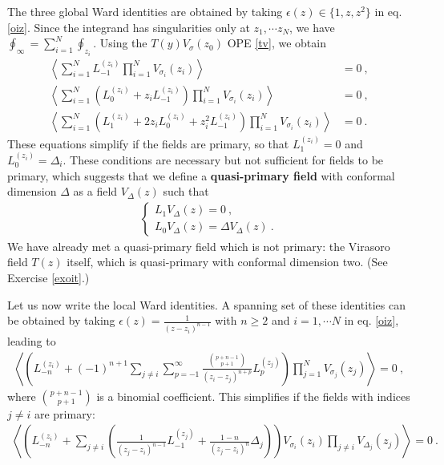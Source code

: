 \documentclass[12pt, a4paper, notitlepage, twoside]{report}
\numberwithin{equation}{section}
\theoremstyle{break}
\begin{document}
The three global Ward identities are obtained by taking $\epsilon(z)\in \{1,z,z^2\}$ in eq. \eqref{oiz}.
Since the integrand has singularities only at $z_1,\cdots z_N$, we have $\oint_\infty=\sum_{i=1}^N \oint_{z_i}$.
Using the 
$T(y)V_\sigma(z_0)$ OPE \eqref{tv}, we obtain 
\begin{align}
\left\langle \sum_{i=1}^N L_{-1}^{(z_i)} \prod_{i=1}^N V_{\sigma_i}(z_i) \right\rangle &= 0 \ ,
\label{slz}
\\
\left\langle \sum_{i=1}^N \left( L_0^{(z_i)} + z_i L_{-1}^{(z_i)}\right) \prod_{i=1}^N V_{\sigma_i}(z_i) \right\rangle & = 0 \ ,
\label{sllz}
\\
\left\langle \sum_{i=1}^N \left( L_1^{(z_i)} + 2z_i L_0^{(z_i)} + z_i^2 L_{-1}^{(z_i)}\right) \prod_{i=1}^N V_{\sigma_i}(z_i) \right\rangle & = 0\ .
\label{slllz}
\end{align}
These equations simplify if the fields are primary, so that $L_1^{(z_i)}=0$ and $L_0^{(z_i)}=\Delta_i$. 
These conditions are necessary but not sufficient for fields to be primary, which suggests that we define a
\textbf{\boldmath quasi-primary field} with conformal dimension $\Delta$ as a field $V_\Delta(z)$ such that 
\begin{align}
 \left\{\begin{array}{l}  L_1 V_\Delta(z) = 0 \ , 
\\
L_0 V_\Delta(z) = \Delta V_\Delta(z) \ .
\end{array}\right. 
\label{lolz}
\end{align}
We have already met a quasi-primary field which is not primary: the Virasoro field $T(z)$ itself, which is quasi-primary with conformal dimension two. (See Exercise \eqref{exoit}.) 

Let us now write the local Ward identities.
A spanning set of these identities can be obtained by taking $\epsilon(z) = \frac{1}{(z-z_i)^{n-1}}$ with $n\geq 2$ and $i=1, \cdots N$ in eq. \eqref{oiz}, leading to
\begin{align}
 \left\langle \left( L_{-n}^{(z_i)} + (-1)^{n+1}\sum_{j\neq i}\sum_{p=-1}^\infty \frac{\binom{p+n-1}{p+1}}{(z_i-z_j)^{n+p}} L_p^{(z_j)}\right)  \prod_{j=1}^N V_{\sigma_j}(z_j) \right\rangle = 0\ ,
\label{lwi}
\end{align}
where $\binom{p+n-1}{p+1}$ is a binomial coefficient.
This simplifies if the fields with indices $j\neq i$ are primary:
\begin{align}
 \left\langle \left( L_{-n}^{(z_i)} + \sum_{j\neq i} \left(\frac{1}{(z_j-z_i)^{n-1}} L_{-1}^{(z_j)}  + \frac{1-n}{(z_j-z_i)^n} \Delta_j\right)\right) V_{\sigma_i}(z_i)\prod_{j\neq i} V_{\Delta_j}(z_j) \right\rangle =0\ .
\label{lwp}
\end{align}
\end{document}
